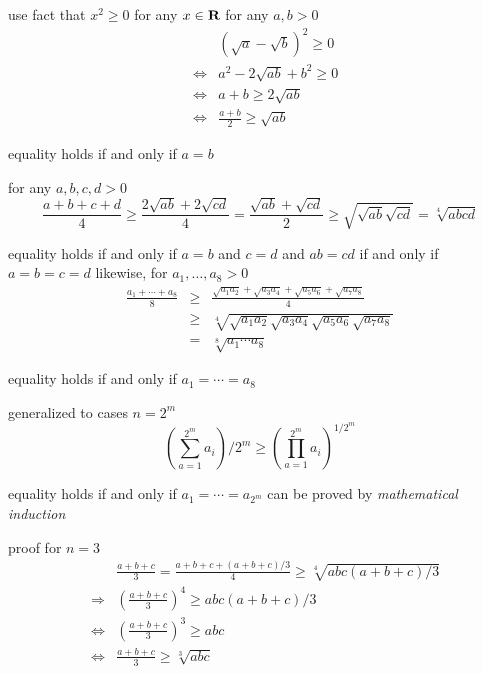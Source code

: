 \documentclass[17pt,landscape]{foils}
\begin{document}
\bit
\item use fact that $x^2\geq0$ for any $x\in\mbox{\bf R}$
\vitem for any $a,b>0$
\begin{eqnarray*}
&&
(\sqrt{a}-\sqrt{b})^2 \geq 0
\\
&\Leftrightarrow&
a^2 - 2\sqrt{ab} + b^2 \geq 0
\\
&\Leftrightarrow&
a + b \geq 2\sqrt{ab}
\\
&\Leftrightarrow&
\frac{a + b}{2} \geq \sqrt{ab}
\end{eqnarray*}
\bit
\item equality holds if and only if $a=b$
\eit
\eit
{}
\bit
\item for any $a,b,c,d>0$
\[
\frac{a+b+c+d}{4}
\geq
\frac{2\sqrt{ab} + 2\sqrt{cd}}{4}
=
\frac{\sqrt{ab} + \sqrt{cd}}{2}
\geq
\sqrt{\sqrt{ab} \sqrt{cd}}
=
\sqrt[4]{abcd}
\]
\bit
\item equality holds if and only if $a=b$ and $c=d$ and $ab=cd$
if and only if $a=b=c=d$
\eit
\vitem likewise, for $a_1,\ldots,a_8>0$
\begin{eqnarray*}
\frac{a_1+\cdots+a_8}{8}
&\geq&
\frac{\sqrt{a_1a_2} + \sqrt{a_3a_4} + \sqrt{a_5a_6} + \sqrt{a_7a_8}}{4}
\\
&\geq&
\sqrt[4]{\sqrt{a_1a_2} \sqrt{a_3a_4} \sqrt{a_5a_6} \sqrt{a_7a_8}}
\\
&=&
\sqrt[8]{a_1\cdots a_8}
\end{eqnarray*}
\bit
\item equality holds if and only if $a_1=\cdots=a_8$
\eit
\eit
{}
\bit
\item generalized to cases $n=2^m$
\[
\left(\sum_{a=1}^{2^m} a_i\right) / 2^m\geq \left({\prod_{a=1}^{2^m} a_i}\right)^{1/2^m}
\]
\bit
\item equality holds if and only if $a_1=\cdots=a_{2^m}$
\eit
\vitem can be proved by \emph{mathematical induction}
\eit
{}
\bit
\item proof for $n=3$
\begin{eqnarray*}
&&
\frac{a+b+c}{3} = \frac{a + b + c + (a+b+c)/3}{4}
\geq \sqrt[4]{abc(a+b+c)/3}
\\
&\Rightarrow&
\left(\frac{a+b+c}{3}\right)^4 \geq {abc(a+b+c)/3}
\\
&\Leftrightarrow&
\left(\frac{a+b+c}{3}\right)^3 \geq abc
\\
&\Leftrightarrow&
\frac{a+b+c}{3} \geq \sqrt[3]{abc}
\end{eqnarray*}
\end{document}
